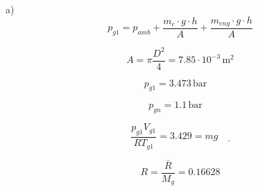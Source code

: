 a) 
\[
p_{g1} = p_{amb} + \frac{m_c \cdot g \cdot h}{A} + \frac{m_{eng} \cdot g \cdot h}{A}
\]

\[
A = \pi \frac{D^2}{4} = 7.85 \cdot 10^{-3} \, \text{m}^2
\]

\[
p_{g1} = 3.473 \, \text{bar} \quad \boxed{}
\]

\[
p_{gn} = 1.1 \, \text{bar} \quad \boxed{}
\]

\[
\frac{p_{g1} V_{g1}}{R T_{g1}} = 3.429 = mg \quad \underline{}
\]

\[
R = \frac{\bar{R}}{M_g} = 0.16628
\]